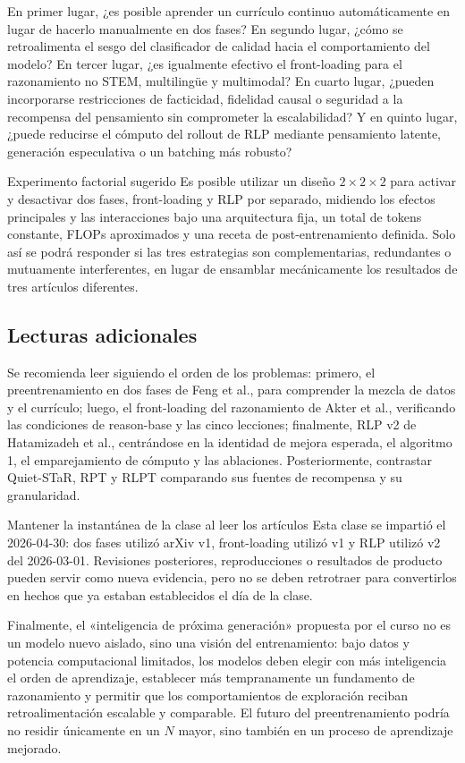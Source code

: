 En primer lugar, ¿es posible aprender un currículo continuo automáticamente en lugar de hacerlo manualmente en dos fases? En segundo lugar, ¿cómo se retroalimenta el sesgo del clasificador de calidad hacia el comportamiento del modelo? En tercer lugar, ¿es igualmente efectivo el front-loading para el razonamiento no STEM, multilingüe y multimodal? En cuarto lugar, ¿pueden incorporarse restricciones de facticidad, fidelidad causal o seguridad a la recompensa del pensamiento sin comprometer la escalabilidad? Y en quinto lugar, ¿puede reducirse el cómputo del rollout de RLP mediante pensamiento latente, generación especulativa o un batching más robusto?

\begin{knowledgebox}{Experimento factorial sugerido}
Es posible utilizar un diseño $2\times2\times2$ para activar y desactivar dos fases, front-loading y RLP por separado, midiendo los efectos principales y las interacciones bajo una arquitectura fija, un total de tokens constante, FLOPs aproximados y una receta de post-entrenamiento definida. Solo así se podrá responder si las tres estrategias son complementarias, redundantes o mutuamente interferentes, en lugar de ensamblar mecánicamente los resultados de tres artículos diferentes.
\end{knowledgebox}

\subsection{Lecturas adicionales}

Se recomienda leer siguiendo el orden de los problemas: primero, el preentrenamiento en dos fases de Feng et al., para comprender la mezcla de datos y el currículo; luego, el front-loading del razonamiento de Akter et al., verificando las condiciones de reason-base y las cinco lecciones; finalmente, RLP v2 de Hatamizadeh et al., centrándose en la identidad de mejora esperada, el algoritmo 1, el emparejamiento de cómputo y las ablaciones. Posteriormente, contrastar Quiet-STaR, RPT y RLPT comparando sus fuentes de recompensa y su granularidad.

\begin{warningbox}{Mantener la instantánea de la clase al leer los artículos}
Esta clase se impartió el 2026-04-30: dos fases utilizó arXiv v1, front-loading utilizó v1 y RLP utilizó v2 del 2026-03-01. Revisiones posteriores, reproducciones o resultados de producto pueden servir como nueva evidencia, pero no se deben retrotraer para convertirlos en hechos que ya estaban establecidos el día de la clase.
\end{warningbox}

Finalmente, el «inteligencia de próxima generación» propuesta por el curso no es un modelo nuevo aislado, sino una visión del entrenamiento: bajo datos y potencia computacional limitados, los modelos deben elegir con más inteligencia el orden de aprendizaje, establecer más tempranamente un fundamento de razonamiento y permitir que los comportamientos de exploración reciban retroalimentación escalable y comparable. El futuro del preentrenamiento podría no residir únicamente en un $N$ mayor, sino también en un proceso de aprendizaje mejorado.


